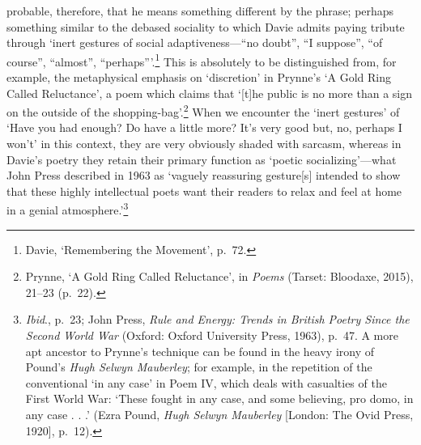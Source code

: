 \documentclass[]{article}
\begin{document}
probable, therefore, that he means something different by the phrase;
perhaps something similar to the debased sociality to which Davie admits
paying tribute through ‘inert gestures of social adaptiveness—“no
doubt”, “I suppose”, “of course”, “almost”, “perhaps”’.\footnote{Davie,
  ‘Remembering the Movement’, p.~72.} This is absolutely to be
distinguished from, for example, the metaphysical emphasis on
‘discretion’ in Prynne’s ‘A Gold Ring Called Reluctance’, a poem which
claims that ‘{[}t{]}he public \textbar{} is no more than a sign on the
outside of the \textbar{} shopping-bag’.\footnote{Prynne, ‘A Gold Ring
  Called Reluctance’, in \emph{Poems} (Tarset: Bloodaxe, 2015), 21–23
  (p.~22).} When we encounter the ‘inert gestures’ of ‘Have \textbar{}
you had enough? Do have a little more? \textbar{} It’s very good but,
no, perhaps I won’t’ in this context, they are very obviously shaded
with sarcasm, whereas in Davie’s poetry they retain their primary
function as ‘poetic socializing’—what John Press described in 1963 as
‘vaguely reassuring gesture{[}s{]} intended to show that these highly
intellectual poets want their readers to relax and feel at home in a
genial atmosphere.’\footnote{\emph{Ibid}., p.~23; John Press, \emph{Rule
  and Energy: Trends in British Poetry Since the Second World War}
  (Oxford: Oxford University Press, 1963), p.~47. A more apt ancestor to
  Prynne’s technique can be found in the heavy irony of Pound’s
  \emph{Hugh Selwyn Mauberley}; for example, in the repetition of the
  conventional ‘in any case’ in Poem IV, which deals with casualties of
  the First World War: ‘These fought in any case, \textbar{} and some
  believing, pro domo, in any case . . .’ (Ezra Pound, \emph{Hugh Selwyn
  Mauberley} {[}London: The Ovid Press, 1920{]}, p.~12).}
\end{document}
